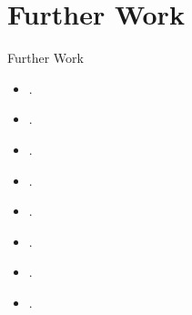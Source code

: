 \documentclass[12pt, trans]{beamer}
\newcommand{\1}[1]{{\mathbf 1}\left\{#1\right\}}        %
\begin{document}
\section{Further Work}

\begin{frame}{Further Work}

\begin{itemize}[<+->]
\item .
\end{itemize}

\end{frame}





\begin{frame}{}

\begin{itemize}[<+->]
\item  .
\end{itemize}

\end{frame}

\begin{frame}{}

\begin{itemize}[<+->]
\item  .
\end{itemize}

\end{frame}


\begin{frame}{}

\begin{itemize}[<+->]
\item  .
\end{itemize}

\end{frame}

\begin{frame}{}

\begin{itemize}[<+->]
\item .
\end{itemize}

\end{frame}


\begin{frame}{}

\begin{itemize}[<+->]
\item  .
\end{itemize}

\end{frame}

\begin{frame}{}

\begin{itemize}[<+->]
\item  .
\end{itemize}

\end{frame}

\begin{frame}{}

\begin{itemize}[<+->]
\item .
\end{itemize}

\end{frame}
\end{document}
